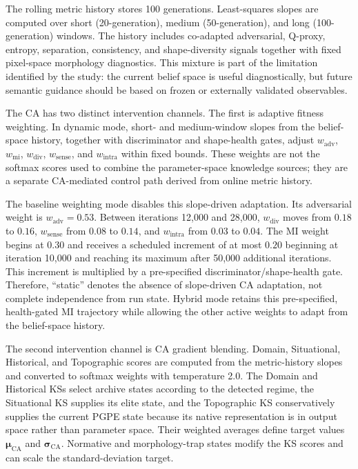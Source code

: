 The rolling metric history stores 100 generations. Least-squares slopes are computed over short (20-generation), medium (50-generation), and long (100-generation) windows. The history includes co-adapted adversarial, Q-proxy, entropy, separation, consistency, and shape-diversity signals together with fixed pixel-space morphology diagnostics. This mixture is part of the limitation identified by the study: the current belief space is useful diagnostically, but future semantic guidance should be based on frozen or externally validated observables.

The CA has two distinct intervention channels. The first is adaptive fitness weighting. In dynamic mode, short- and medium-window slopes from the belief-space history, together with discriminator and shape-health gates, adjust $w_{\text{adv}}$, $w_{\text{mi}}$, $w_{\text{div}}$, $w_{\text{sense}}$, and $w_{\text{intra}}$ within fixed bounds. These weights are not the softmax scores used to combine the parameter-space knowledge sources; they are a separate CA-mediated control path derived from online metric history.

The baseline weighting mode disables this slope-driven adaptation. Its adversarial weight is $w_{\text{adv}}=0.53$. Between iterations 12,000 and 28,000, $w_{\text{div}}$ moves from $0.18$ to $0.16$, $w_{\text{sense}}$ from $0.08$ to $0.14$, and $w_{\text{intra}}$ from $0.03$ to $0.04$. The MI weight begins at $0.30$ and receives a scheduled increment of at most $0.20$ beginning at iteration 10,000 and reaching its maximum after 50,000 additional iterations. This increment is multiplied by a pre-specified discriminator/shape-health gate. Therefore, ``static'' denotes the absence of slope-driven CA adaptation, not complete independence from run state. Hybrid mode retains this pre-specified, health-gated MI trajectory while allowing the other active weights to adapt from the belief-space history.

The second intervention channel is CA gradient blending. Domain, Situational, Historical, and Topographic scores are computed from the metric-history slopes and converted to softmax weights with temperature 2.0. The Domain and Historical KSs select archive states according to the detected regime, the Situational KS supplies its elite state, and the Topographic KS conservatively supplies the current PGPE state because its native representation is in output space rather than parameter space. Their weighted averages define target values $\boldsymbol{\mu}_{\text{CA}}$ and $\boldsymbol{\sigma}_{\text{CA}}$. Normative and morphology-trap states modify the KS scores and can scale the standard-deviation target.

